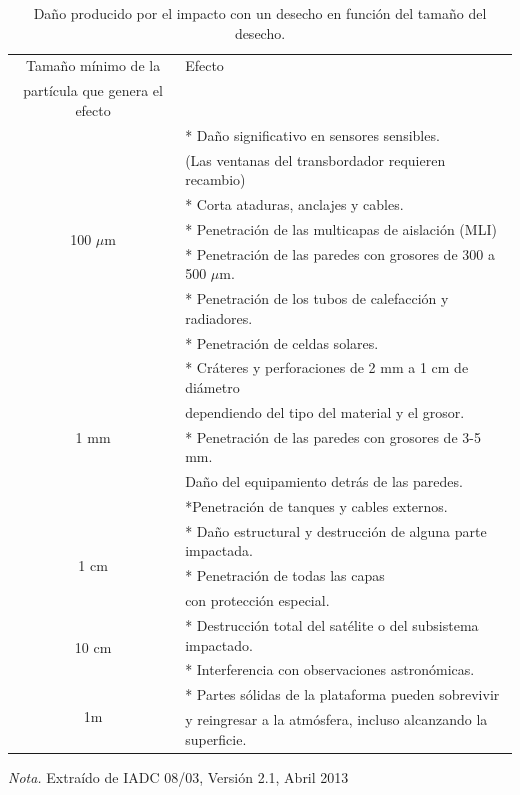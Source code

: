  \begin{table}[h]
 \caption[Da\~no seg\'un el tama\~no del desecho.]{Da\~no producido por el impacto con un desecho en funci\'on del tama\~no del desecho.}
\begin{tabular}[c]{c| l}
\hline
\hline
Tama\~no m\'inimo de la  &    Efecto\\
part\'icula que genera el efecto & \\
\hline
\hline
\multirow{ 7}{*}{100 $\mu$m }& * Da\~no significativo en sensores sensibles.\\
& (Las ventanas del transbordador requieren recambio)\\
& * Corta ataduras, anclajes y cables.\\
& * Penetraci\'on de las multicapas de aislaci\'on (MLI)\\
& * Penetraci\'on de las paredes con grosores de 300 a 500 $\mu$m.\\
& * Penetraci\'on de los tubos de calefacci\'on y radiadores.\\
& * Penetraci\'on de celdas solares.\\
\hline 
\multirow{ 5}{*}{1 mm }& * Cr\'ateres y perforaciones de 2 mm a 1 cm de di\'ametro\\
& dependiendo del tipo del material y el grosor.\\
& * Penetraci\'on de las paredes con grosores de 3-5 mm.\\
& Da\~no del equipamiento detr\'as de las paredes.\\
& *Penetraci\'on de tanques y cables externos.\\
\hline
\multirow{ 3}{*}{1 cm } & * Da\~no estructural y destrucci\'on de alguna parte impactada.\\
& * Penetraci\'on de todas las capas\\ %
& con protecci\'on especial.\\
\hline
\multirow{ 2}{*}{10 cm } & * Destrucci\'on total del sat\'elite o del subsistema impactado.\\
& * Interferencia con observaciones astron\'omicas.\\
\hline
\multirow{ 2}{*}{1m}& * Partes s\'olidas de la plataforma pueden sobrevivir\\
& y reingresar a la atmósfera, incluso alcanzando la superficie.\\
\hline
\end{tabular}
\label{tamanioDanio}
\begin{flushleft}
\small {\it{Nota.}}  Extra\'ido de IADC 08/03, Versi\'on 2.1, Abril 2013
\end{flushleft}
\end{table}

